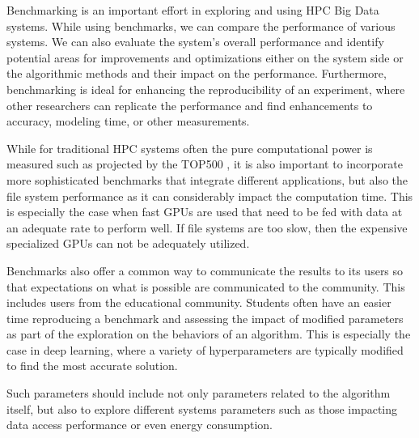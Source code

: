 \documentclass[utf8]{FrontiersinVancouver} %
\begin{document}
Benchmarking is an important effort in exploring and using HPC Big
Data systems.  While using benchmarks, we can compare the performance
of various systems. We can also evaluate the system's overall
performance and identify potential areas for improvements and
optimizations either on the system side or the algorithmic methods and
their impact on the performance. Furthermore, benchmarking is ideal
for enhancing the reproducibility of an experiment, where other
researchers can replicate the performance and find enhancements to
accuracy, modeling time, or other measurements.

While for traditional HPC systems often the pure computational power
is measured such as projected by the TOP500
\cite{dongarra1997top500,www-top500}, it is also important to
incorporate more sophisticated benchmarks that integrate different
applications, but also the file system performance as it can
considerably impact the computation time. This is especially the case
when fast GPUs are used that need to be fed with data at an adequate
rate to perform well. If file systems are too slow, then the expensive
specialized GPUs can not be adequately utilized.

Benchmarks also offer a common way to communicate the results to its
users so that expectations on what is possible are communicated to the
community. This includes users from the educational
community. Students often have an easier time reproducing a benchmark
and assessing the impact of modified parameters as part of the
exploration on the behaviors of an algorithm. This is especially the
case in deep learning, where a variety of hyperparameters are
typically modified to find the most accurate solution.

Such parameters should include not only parameters related to the
algorithm itself, but also to explore different systems parameters
such as those impacting data access performance or even energy
consumption.
\end{document}

